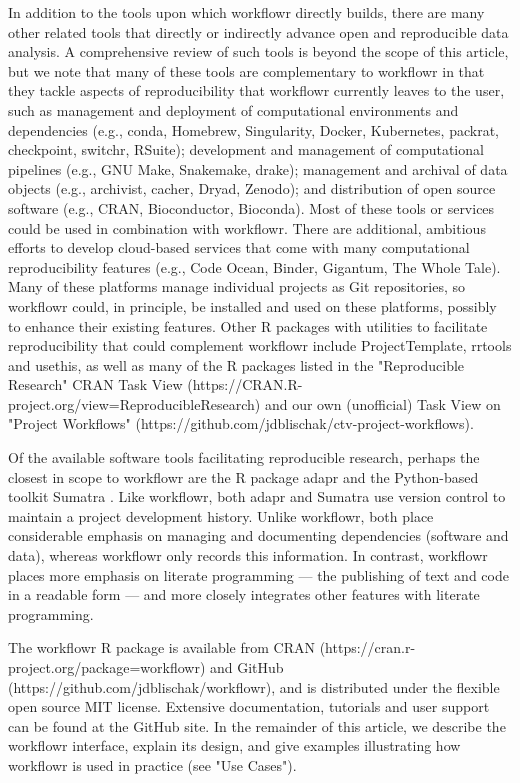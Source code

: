\documentclass[9pt,a4paper]{extarticle}
\begin{document}
In addition to the tools upon which workflowr directly builds, there are
many other related tools that directly or indirectly advance open and
reproducible data analysis. A comprehensive review of such tools is
beyond the scope of this article, but we note that many of these tools
are complementary to workflowr in that they tackle aspects of
reproducibility that workflowr currently leaves to the user, such as
management and deployment of computational environments and dependencies
(e.g., conda, Homebrew, Singularity, Docker, Kubernetes, packrat,
checkpoint, switchr, RSuite); development and management of
computational pipelines (e.g., GNU Make, Snakemake, drake); management
and archival of data objects (e.g., archivist, cacher, Dryad, Zenodo);
and distribution of open source software (e.g., CRAN, Bioconductor,
Bioconda). Most of these tools or services could be used in combination
with workflowr. There are additional, ambitious efforts to develop
cloud-based services that come with many computational reproducibility
features (e.g., Code Ocean, Binder, Gigantum, The Whole Tale). Many of
these platforms manage individual projects as Git repositories, so
workflowr could, in principle, be installed and used on these platforms,
possibly to enhance their existing features. Other R packages with
utilities to facilitate reproducibility that could complement workflowr
include ProjectTemplate, rrtools and usethis, as well as many of the R
packages listed in the "Reproducible Research" CRAN Task View
(https://CRAN.R-project.org/view=ReproducibleResearch) and our own
(unofficial) Task View on "Project Workflows"
(https://github.com/jdblischak/ctv-project-workflows).

Of the available software tools facilitating reproducible research,
perhaps the closest in scope to workflowr are the R package adapr
\cite{Gelfond2018} and the Python-based toolkit Sumatra
\cite{Davidson2014}. Like workflowr, both adapr and Sumatra use version
control to maintain a project development history. Unlike workflowr,
both place considerable emphasis on managing and documenting
dependencies (software and data), whereas workflowr only records this
information. In contrast, workflowr places more emphasis on literate
programming --- the publishing of text and code in a readable form ---
and more closely integrates other features with literate programming.

The workflowr R package is available from CRAN
(https://cran.r-project.org/package=workflowr) and GitHub
(https://github.com/jdblischak/workflowr), and is distributed under the
flexible open source MIT license. Extensive documentation, tutorials and
user support can be found at the GitHub site. In the remainder of this
article, we describe the workflowr interface, explain its design, and
give examples illustrating how workflowr is used in practice (see "Use
Cases").
\end{document}
